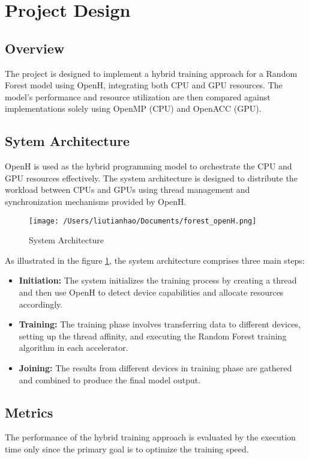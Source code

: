 \documentclass[11.5pt]{article}
\begin{document}
\section{Project Design}
\subsection{Overview}
The project is designed to implement a hybrid training approach for a Random Forest model using OpenH, integrating both CPU and GPU resources. 
The model's performance and resource utilization are then compared against implementations solely using OpenMP (CPU) and OpenACC (GPU).

\subsection{Sytem Architecture}
OpenH is used as the hybrid programming model to orchestrate the CPU and GPU resources effectively. 
The system architecture is designed to distribute the workload between CPUs and GPUs using thread management and synchronization mechanisms provided by OpenH.
\begin{figure}[ht]
    \centering
    \texttt{[image: /Users/liutianhao/Documents/forest\_openH.png]}
    \caption{System Architecture}
    \label{fig:system_architecture}
\end{figure}


As illustrated in the figure \ref{fig:system_architecture}, the system architecture comprises three main steps:
\begin{itemize}
    \item \textbf{Initiation:} 
    The system initializes the training process by creating a thread and then use OpenH to detect device capabilities and allocate resources accordingly.    
    \item \textbf{Training:} 
    The training phase involves transferring data to different devices, setting up the thread affinity, and executing the Random Forest training algorithm in each accelerator. 
    \item \textbf{Joining:} 
    The results from different devices in training phase are gathered and combined to produce the final model output.
\end{itemize}

\subsection{Metrics}
The performance of the hybrid training approach is evaluated by the execution time only since the primary goal is to optimize the training speed.
\end{document}
